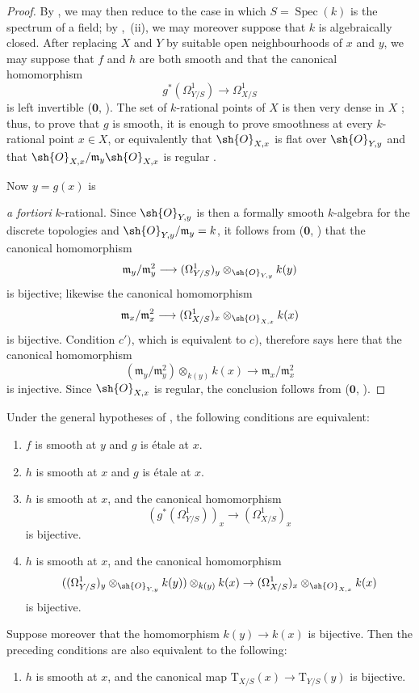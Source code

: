 \begin{proof}
By , we may then reduce to the case in which $S=\operatorname{Spec}(k)$ is the spectrum of a field; by ,~(ii), we may moreover suppose that $k$ is algebraically closed.
After replacing $X$ and $Y$ by suitable open neighbourhoods of $x$ and $y$, we may suppose that $f$ and $h$ are both smooth and that the canonical homomorphism
\[
g^*(\Omega^1_{Y/S}) \to \Omega^1_{X/S}
\]
is left invertible ($\mathbf{0}$, ).
The set of $k$-rational points of $X$ is then very dense in $X$ ; thus, to prove that $g$ is smooth, it is enough to prove smoothness at every $k$-rational point $x\in X$, or equivalently that $\sh{O}_{X,x}$ is flat over $\sh{O}_{Y,y}$ and that $\sh{O}_{X,x}/\mathfrak m_y\sh{O}_{X,x}$ is regular .

Now $y=g(x)$ is


\emph{a fortiori} $k$-rational.
Since $\sh{O}_{Y,y}$ is then a formally smooth $k$-algebra for the discrete topologies and $\sh{O}_{Y,y}/\mathfrak m_y=k$, it follows from ($\mathbf{0}$, ) that the canonical homomorphism
\[
  \mathfrak m_y/\mathfrak m_y^2
  \longrightarrow
  (\Omega^1_{Y/S})_y\otimes_{\sh{O}_{Y,y}}k(y)
\]
is bijective; likewise the canonical homomorphism
\[
  \mathfrak m_x/\mathfrak m_x^2
  \longrightarrow
  (\Omega^1_{X/S})_x\otimes_{\sh{O}_{X,x}}k(x)
\]
is bijective.
Condition $c')$, which is equivalent to $c)$, therefore says here that the canonical homomorphism
\[
  (\mathfrak m_y/\mathfrak m_y^2)\otimes_{k(y)}k(x)
  \longrightarrow \mathfrak m_x/\mathfrak m_x^2
\]
is injective.
Since $\sh{O}_{X,x}$ is regular, the conclusion follows from ($\mathbf{0}$, ).
\end{proof}

\begin{corollary}[17.11.2]
\label{IV.17.11.2}
Under the general hypotheses of , the following conditions are equivalent:
\begin{enumerate}
  \item[a)] $f$ is smooth at $y$ and $g$ is \'etale at $x$.
  \item[b)] $h$ is smooth at $x$ and $g$ is \'etale at $x$.
  \item[c)] $h$ is smooth at $x$, and the canonical homomorphism
\[
(g^*(\Omega^1_{Y/S}))_x \to (\Omega^1_{X/S})_x
\]
is bijective.
  \item[c')] $h$ is smooth at $x$, and the canonical homomorphism
\[
((\Omega^1_{Y/S})_y\otimes_{\sh{O}_{Y,y}} k(y))\otimes_{k(y)} k(x) \to (\Omega^1_{X/S})_x\otimes_{\sh{O}_{X,x}} k(x)
\]
is bijective.
\end{enumerate}
Suppose moreover that the homomorphism $k(y)\to k(x)$ is bijective.
Then the preceding conditions are also equivalent to the following:
\begin{enumerate}
  \item[d)] $h$ is smooth at $x$, and the canonical map $\mathrm{T}_{X/S}(x)\to\mathrm{T}_{Y/S}(y)$  is bijective.
\end{enumerate}
\end{corollary}

